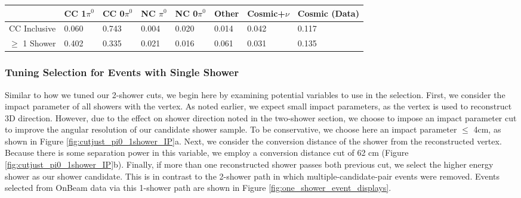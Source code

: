 \begin{table}[H]
\centering
{}
 \begin{tabular}{| l | l | l |l|l|l|l|l|}
 \hline
 & CC 1$\pi^0$ & CC 0$\pi^0$ & NC $\pi^0$ & NC 0$\pi^0$ & Other & Cosmic+$\nu$& Cosmic (Data) \\ [0.1ex] \hline
CC Inclusive & 0.060 & 0.743 & 0.004 & 0.020 & 0.014 & 0.042 & 0.117 \\
$\geq$ 1 Shower & 0.402 & 0.335 & 0.021 & 0.016 & 0.061 & 0.031 & 0.135\\ \hline
\end{tabular}
\end{table}

\subsubsection{Tuning Selection for Events with Single Shower}

Similar to how we tuned our 2-shower cuts, we begin here by examining potential variables to use in the selection.  First, we consider the impact parameter of all showers with the vertex.  As noted earlier, we expect small impact parameters, as the vertex is used to reconstruct 3D direction. However, due to the effect on shower direction noted in the two-shower section, we choose to impose an impact parameter cut to improve the angular resolution of our candidate shower sample. To be conservative, we choose here an impact parameter $\leq$ 4cm, as shown in Figure \ref{fig:cutjust_pi0_1shower_IP}a.   Next, we consider the conversion distance of the shower from the reconstructed vertex. Because there is some separation power in this variable, we employ a conversion distance cut of 62 cm (Figure \ref{fig:cutjust_pi0_1shower_IP}b).  Finally, if more than one reconstructed shower passes both previous cut, we select the higher energy shower as our shower candidate. This is in contrast to the 2-shower path in which multiple-candidate-pair events were removed.  Events selected from OnBeam data via this 1-shower path are shown in Figure \ref{fig:one_shower_event_displays}. 


